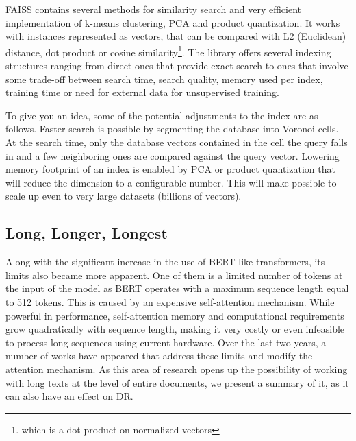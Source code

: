     FAISS contains several methods for similarity search and very efficient implementation of k-means clustering, PCA and product quantization. It works with instances represented as vectors, that can be compared with L2 (Euclidean) distance, dot product or cosine similarity\footnote{which is a dot product on normalized vectors}. The library offers several indexing structures ranging from direct ones that provide exact search to ones that involve some trade-off between search time, search quality, memory used per index, training time or need for external data for unsupervised training. 
    
    To give you an idea, some of the potential adjustments to the index are as follows. Faster search is possible by segmenting the database into Voronoi cells. At the search time, only the database vectors contained in the cell the query falls in and a few neighboring ones are compared against the query vector. Lowering memory footprint of an index is enabled by PCA or product quantization that will reduce the dimension to a configurable number. This will make possible to scale up even to very large datasets (billions of vectors).
    


\subsection{Long, Longer, Longest} %
\label{section:longformers}
    Along with the significant increase in the use of BERT-like transformers, its limits also became more apparent. One of them is a limited number of tokens at the input of the model as BERT operates with a maximum sequence length equal to 512 tokens. This is caused by an expensive self-attention mechanism. While powerful in performance, self-attention memory and computational requirements grow quadratically with sequence length, making it very costly or even infeasible to process long sequences using current hardware. Over the last two years, a number of works have appeared that address these limits and modify the attention mechanism. As this area of research opens up the possibility of working with long texts at the level of entire documents, we present a summary of it, as it can also have an effect on DR.
    
